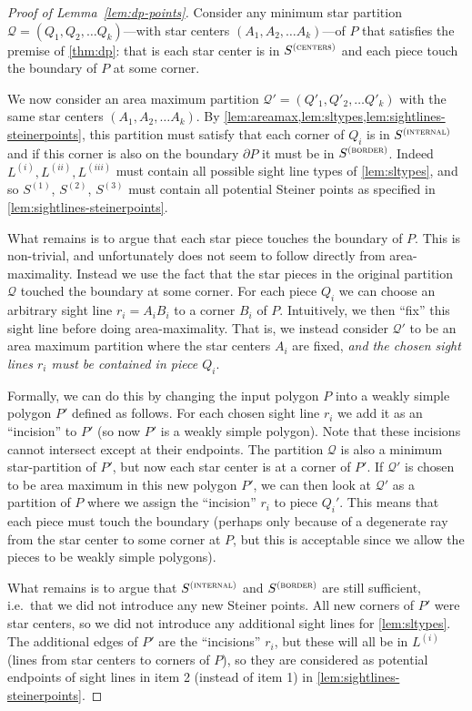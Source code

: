 \documentclass[10pt,a4paper]{article}
\newcommand\Scen{S^{\textsc{(centers)}}}
\newcommand\Sint{S^{\textsc{(internal)}}}
\newcommand\Sbor{S^{\textsc{(border)}}}
\begin{document}
\begin{proof}[Proof of Lemma~\ref{lem:dp-points}]
Consider any minimum star partition $\mathcal{Q} = (Q_1, Q_2, \ldots Q_k)$---with star centers $(A_1, A_2, \ldots A_k)$---of $P$ that satisfies the premise of \cref{thm:dp}: that is each star center is in $\Scen$ and each piece touch the boundary of $P$ at some corner.

We now consider an area maximum partition 
 $\mathcal{Q}' = (Q'_1, Q'_2, \ldots Q'_k)$ with the same star centers $(A_1, A_2, \ldots A_k)$.
By \cref{lem:areamax,lem:sltypes,lem:sightlines-steinerpoints}, this partition must satisfy that each corner of $Q_i$ is in $\Sint$ and if this corner is also on the boundary $\partial P$ it must be in $\Sbor$. Indeed $L^{(i)}, L^{(ii)}, L^{(iii)}$ must contain all possible sight line types of \cref{lem:sltypes}, and so $S^{(1)}$, $S^{(2)}$, $S^{(3)}$ must contain all potential Steiner points as specified in \cref{lem:sightlines-steinerpoints}.

What remains is to argue that each star piece touches the boundary of $P$. This is non-trivial, and unfortunately does not seem to follow directly from area-maximality. Instead we use the fact that the star pieces in the original partition $\mathcal{Q}$ touched the boundary at some corner. For each piece $Q_i$ we can choose an arbitrary sight line $r_i = A_iB_i$ to a corner $B_i$ of $P$. Intuitively, we then ``fix'' this sight line before doing area-maximality. That is, we instead consider $\mathcal{Q}'$ to be an area maximum partition where the star centers $A_i$ are fixed, \emph{and the chosen sight lines $r_i$ must be contained in piece $Q_i$}.

Formally, we can do this by changing the input polygon $P$ into a weakly simple polygon $P'$ defined as follows. For each chosen sight line $r_i$ we add it as an ``incision'' to $P'$ (so now $P'$ is a weakly simple polygon).
Note that these incisions cannot intersect except at their endpoints. The partition $\mathcal{Q}$ is also a minimum star-partition of $P'$, but now each star center is at a corner of $P'$. If $\mathcal{Q}'$ is chosen to be area maximum in this new polygon $P'$, we can then look at $\mathcal{Q}'$ as a partition of $P$ where we assign the ``incision'' $r_i$ to piece $Q_i'$. This means that each piece must touch the boundary (perhaps only because of a degenerate ray from the star center to some corner at $P$, but this is acceptable since we allow the pieces to be weakly simple polygons).

What remains is to argue that $\Sint$ and $\Sbor$ are still sufficient, i.e.\ that we did not introduce any new Steiner points. All new corners of $P'$ were star centers, so we did not introduce any additional sight lines for \cref{lem:sltypes}. The additional edges of $P'$ are the ``incisions'' $r_i$, but these will all be in $L^{(i)}$ (lines from star centers to corners of $P$), so they are considered as potential endpoints of sight lines in item 2 (instead of item 1) in \cref{lem:sightlines-steinerpoints}.
\end{proof}
\end{document}

